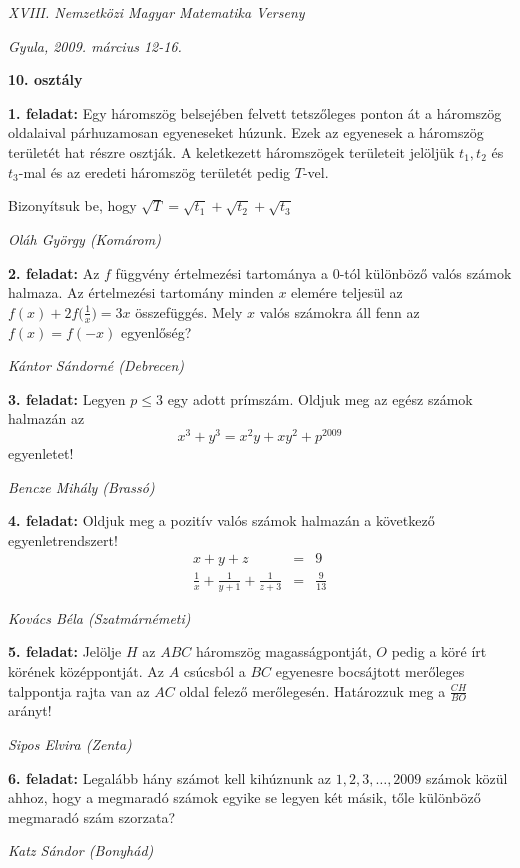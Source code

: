 \documentclass[a4paper,10pt]{article}
\def\ki#1#2{\hfill {\it #1 (#2)}\medskip}
\begin{document}
\begin{center} \Large {\em XVIII. Nemzetközi Magyar Matematika Verseny} \end{center}
\begin{center} \large{\em Gyula, 2009. március 12-16.} \end{center}
\smallskip
\begin{center} \large{\bf 10. osztály} \end{center}
\bigskip 

{\bf 1. feladat: }
Egy háromszög belsejében felvett tetszőleges ponton át a háromszög
oldalaival pár\-hu\-za\-mo\-san egyeneseket húzunk. Ezek az egyenesek a háromszög területét hat
részre osztják. A keletkezett háromszögek területeit jelöljük $t_1, t_2$ és $t_3$-mal és az eredeti
háromszög területét pedig $T$-vel.

Bizonyítsuk be, hogy $ \sqrt{T}=\sqrt{t_1}+\sqrt{t_2}+\sqrt{t_3}$

\ki{Oláh György }{Komárom}\medskip

{\bf 2. feladat: } 
Az $f$ függvény értelmezési tartománya a 0-tól különböző valós számok
halmaza. Az értelmezési tartomány minden $x$ elemére teljesül az $ \displaystyle{f(x)+2f \Big(\frac 1x\Big)=3}x $
összefüggés. Mely $x$ valós számokra áll fenn az $f(x)=f(-x)$ egyenlőség?


\ki{Kántor Sándorné }{Debrecen}\medskip

{\bf 3. feladat: } 
Legyen $p\leq 3$ egy adott prímszám. Oldjuk meg az egész számok halmazán az
$$ x^3+y^3=x^2y+xy^2+p^{2009} $$
egyenletet!

\ki{Bencze Mihály }{Brassó}\medskip

{\bf 4. feladat: }
Oldjuk meg a pozitív valós számok halmazán a következő egyenletrendszert!
\begin{eqnarray}
x+y+z & = & 9 \\
\frac 1x+\frac 1{y+1}+\frac 1{z+3} & = & \frac 9{13} 
\end{eqnarray}

\ki{Kovács Béla}{Szatmárnémeti}\medskip

{\bf 5. feladat: }
Jelölje $H$ az $ABC$ háromszög magasságpontját, $O$ pedig a köré írt körének
középpontját. Az $A$ csúcsból a $BC$ egyenesre bocsájtott merőleges talppontja rajta van az $AC$
oldal felező merőlegesén. Határozzuk meg a $\displaystyle{\frac {CH}{BO}}$
arányt!
 
\ki{Sipos Elvira}{Zenta}\medskip

{\bf 6. feladat: } 
Legalább hány számot kell kihúznunk az $1, 2, 3,\dots , 2009 $ számok közül
ahhoz, hogy a megmaradó számok egyike se legyen két másik, tőle különböző megmaradó
szám szorzata?

\ki{Katz Sándor}{Bonyhád}\medskip

\vfill
\end{document}

